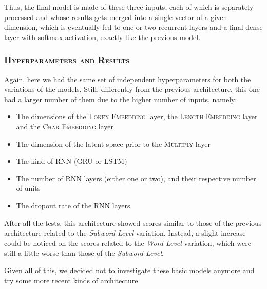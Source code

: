 Thus, the final model is made of these three inputs, each of which is separately processed and whose results gets merged into a single vector of a given dimension, which is eventually fed to one or two recurrent layers and a final dense layer with softmax activation, exactly like the previous model.

\subsubsection{\textsc{Hyperparameters and Results}}

Again, here we had the same set of independent hyperparameters for both the variations of the models.
Still, differently from the previous architecture, this one had a larger number of them due to the higher number of inputs, namely:
\begin{itemize}
    \item The dimensions of the \textsc{Token Embedding} layer, the \textsc{Length Embedding} layer and the \textsc{Char Embedding} layer
    \item The dimension of the latent space prior to the \textsc{Multiply} layer 
    \item The kind of \textsc{RNN} (\textsc{GRU} or \textsc{LSTM})
    \item The number of \textsc{RNN} layers (either one or two), and their respective number of units
    \item The dropout rate of the \textsc{RNN} layers
\end{itemize}

After all the tests, this architecture showed scores similar to those of the previous architecture related to the \textit{Subword-Level} variation.
Instead, a slight increase could be noticed on the scores related to the \textit{Word-Level} variation, which were still a little worse than those of the \textit{Subword-Level}.

Given all of this, we decided not to investigate these basic models anymore and try some more recent kinds of architecture.